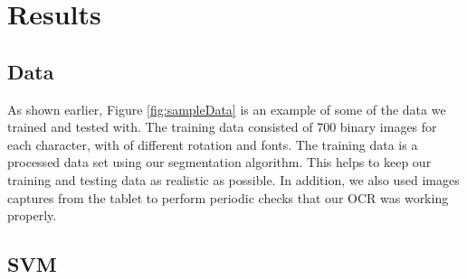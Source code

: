 \section{Results}

\subsection{Data}
As shown earlier, Figure \ref{fig:sampleData} is an example of some of the data we trained and tested with.
The training data consisted of 700 binary images for each character, with of different rotation and fonts.
The training data is a processed data set using our segmentation algorithm. This helps to keep our
training and testing data as realistic as possible. In addition, we also used images captures from the
tablet to perform periodic checks that our OCR was working properly.

\subsection{SVM}

